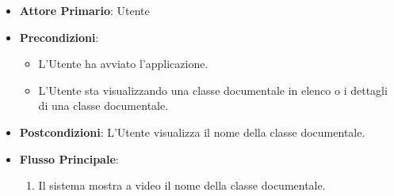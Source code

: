 \begin{itemize}
    \item \textbf{Attore Primario}: Utente
    \item \textbf{Precondizioni}: \begin{itemize}
        \item L'Utente ha avviato l'applicazione.
        \item L'Utente sta visualizzando una classe documentale in elenco o i dettagli di una classe documentale.
    \end{itemize}
    \item \textbf{Postcondizioni}: L'Utente visualizza il nome della classe documentale.
    \item \textbf{Flusso Principale}:
          \begin{enumerate}
              \item Il sistema mostra a video il nome della classe documentale.
          \end{enumerate}
\end{itemize}

